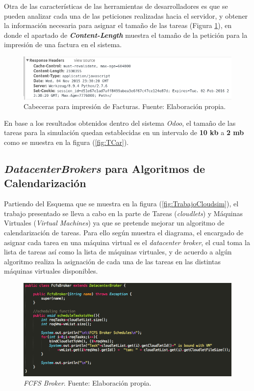 Otra de las características de las herramientas de desarrolladores es que se pueden analizar cada una de las peticiones realizadas hacia el servidor, y obtener la información necesaria para asignar el tamaño de las tareas (Figura \ref{fig:HeaderRequest}), en donde el apartado de \textit{\textbf{Content-Length}} muestra el tamaño de la petición para la impresión de una factura en el sistema.

\renewcommand\thefigure{\arabic{figure}}
\begin{figure}[h!]
	\centering
	\includegraphics[scale=0.5]{media/odoo/7}
	\caption{Cabeceras para impresión de Facturas. Fuente: Elaboración propia.}
	\label{fig:HeaderRequest}
\end{figure}

En base a los resultados obtenidos dentro del sistema \textit{Odoo}, el tamaño de las tareas para la simulación quedan establecidas en un intervalo de \textbf{10 kb} a \textbf{2 mb} como se muestra en la figura (\ref{fig:TCar}).


\subsection*{\textit{DatacenterBrokers} para Algoritmos de Calendarización}

Partiendo del Esquema que se muestra en la figura (\ref{fig:TrabajoCloudsim}), el trabajo presentado se lleva a cabo en la parte de Tareas (\textit{cloudlets}) y M\'aquinas Virtuales (\textit{Virtual Machines}) ya que se pretende mejorar un algoritmo de calendarizaci\'on de tareas.
Para ello seg\'un muestra el diagrama, el encargado de asignar cada tarea en una m\'aquina virtual es el \textit{datacenter broker}, el cual toma la lista de tareas as\'i como la lista de m\'aquinas virtuales, y de acuerdo a alg\'un algoritmo realiza la asignaci\'on de cada una de las tareas en las distintas m\'aquinas virtuales disponibles.

\renewcommand\thefigure{\arabic{figure}}
\begin{figure}[h!]
	\centering
	\includegraphics[scale=0.4]{media/FCFS_broker}
	\caption{\textit{FCFS Broker}. Fuente: Elaboración propia.}
	\label{fig:fcfsBroker}
\end{figure}

